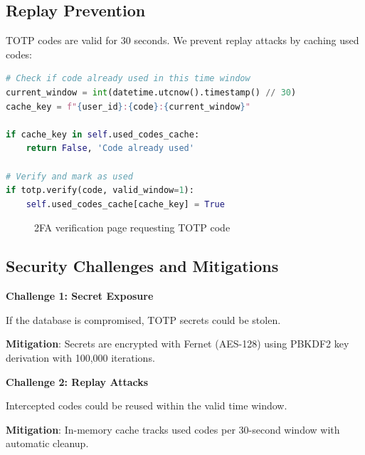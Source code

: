 \documentclass[12pt,a4paper]{article}
\begin{document}
\subsection{Replay Prevention}

TOTP codes are valid for 30 seconds. We prevent replay attacks by caching used codes:

\begin{lstlisting}[language=Python]
# Check if code already used in this time window
current_window = int(datetime.utcnow().timestamp() // 30)
cache_key = f"{user_id}:{code}:{current_window}"

if cache_key in self.used_codes_cache:
    return False, 'Code already used'

# Verify and mark as used
if totp.verify(code, valid_window=1):
    self.used_codes_cache[cache_key] = True
\end{lstlisting}

\begin{figure}[H]
    \centering
    \caption{2FA verification page requesting TOTP code}
    \label{fig:2fa_verify}
\end{figure}

\subsection{Security Challenges and Mitigations}

\textbf{Challenge 1: Secret Exposure}

If the database is compromised, TOTP secrets could be stolen.

\textbf{Mitigation}: Secrets are encrypted with Fernet (AES-128) using PBKDF2 key derivation with 100,000 iterations.

\textbf{Challenge 2: Replay Attacks}

Intercepted codes could be reused within the valid time window.

\textbf{Mitigation}: In-memory cache tracks used codes per 30-second window with automatic cleanup.
\end{document}
